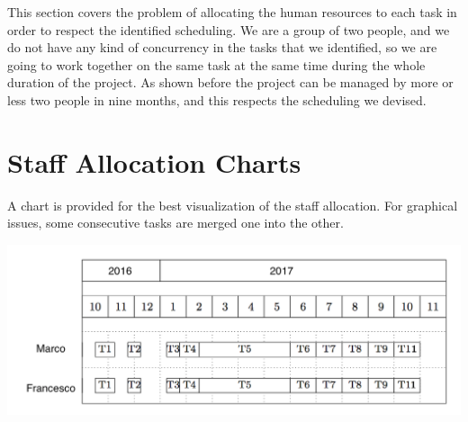 This section covers the problem of allocating the human resources to each task in order to respect the identified scheduling.
We are a group of two people, and we do not have any kind of concurrency in the tasks that we identified, so we are going to work together on the same task at the same time during the whole duration of the project.
As shown before the project can be managed by more or less two people in nine months, and this respects the scheduling we devised.

\section{Staff Allocation Charts}
A chart is provided for the best visualization of the staff allocation.
For graphical issues, some consecutive tasks are merged one into the other.

\begin{center}
  \includegraphics[width=\textwidth]{Resources/resources.png}
  \label{Staff allocation chart}
\end{center}
